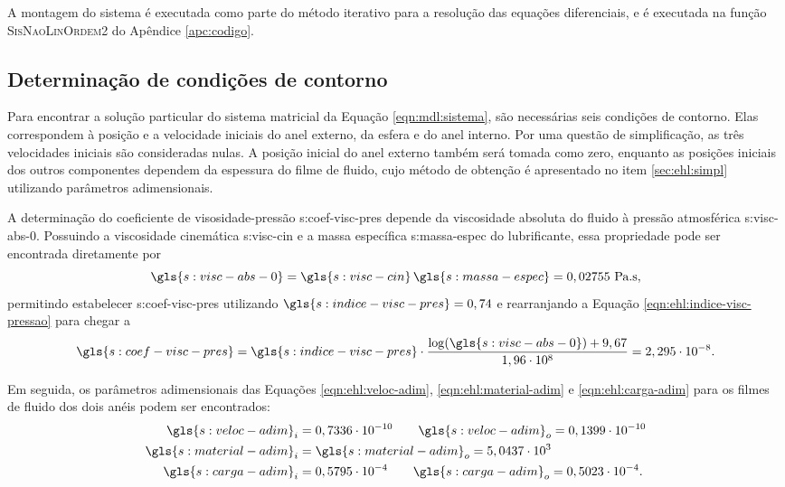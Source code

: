 \documentclass[12pt,oneside,english,brazil,lmodern,siglas,simbolos,cite=num]{ucsmonograph}
\begin{document}
	A montagem do sistema é executada como parte do método iterativo para a resolução das equações diferenciais, e é executada na função \textsc{SisNaoLinOrdem2} do Apêndice \ref{apc:codigo}.
		
	\subsection{Determinação de condições de contorno}
	Para encontrar a solução particular do sistema matricial da Equação \ref{eqn:mdl:sistema}, são necessárias seis condições de contorno.
	Elas correspondem à posição e a velocidade iniciais do anel externo, da esfera e do anel interno.
	Por uma questão de simplificação, as três velocidades iniciais são consideradas nulas.
	A posição inicial do anel externo também será tomada como zero, enquanto as posições iniciais dos outros componentes dependem da espessura do filme de fluido, cujo método de obtenção é apresentado no item \ref{sec:ehl:simpl} utilizando parâmetros adimensionais.
	
	A determinação do coeficiente de visosidade-pressão \gls{s:coef-visc-pres} depende da viscosidade absoluta do fluido à pressão atmosférica \gls{s:visc-abs-0}.
	Possuindo a viscosidade cinemática \gls{s:visc-cin} e a massa específica \gls{s:massa-espec} do lubrificante, essa propriedade pode ser encontrada diretamente por \cite{roelands:1966}
	\begin{equation}
		\gls{s:visc-abs-0} = \gls{s:visc-cin}\,\gls{s:massa-espec} =
		0,02755\ \text{Pa.s},
	\end{equation}
	permitindo estabelecer \gls{s:coef-visc-pres} utilizando $\gls{s:indice-visc-pres} = 0,74$ e rearranjando a Equação \ref{eqn:ehl:indice-visc-pressao} para chegar a
	\begin{equation}
		\gls{s:coef-visc-pres} = \gls{s:indice-visc-pres}\cdot
		\frac{\log(\gls{s:visc-abs-0})+9,67}{1,96\cdot 10^8} =
		2,295\cdot 10^{-8}.
	\end{equation}
	
	Em seguida, os parâmetros adimensionais das Equações \ref{eqn:ehl:veloc-adim}, \ref{eqn:ehl:material-adim} e \ref{eqn:ehl:carga-adim} para os filmes de fluido dos dois anéis podem ser encontrados:
	\begin{align*}
		\gls{s:veloc-adim}_i &= 0,7336\cdot 10^{-10} \qquad
		\gls{s:veloc-adim}_o = 0,1399\cdot 10^{-10}\\
		\gls{s:material-adim}_i &= \gls{s:material-adim}_o =
		5,0437\cdot 10^3\\
		\gls{s:carga-adim}_i &= 0,5795\cdot 10^{-4} \qquad
		\gls{s:carga-adim}_o = 0,5023\cdot 10^{-4}.
	\end{align*}
	
\end{document}
